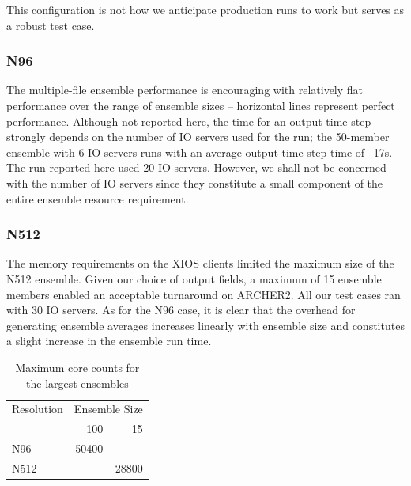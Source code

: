 \documentclass[twocolumn, 12pt]{paper}
\begin{document}
 This configuration is not how we anticipate production runs to work but serves as a robust test case.

\subsubsection{N96}

The multiple-file ensemble performance is encouraging with relatively flat performance over the range of ensemble sizes -- horizontal lines represent perfect performance.
Although not reported here, the time for an output time step strongly depends on the number of IO servers used for the run; the 50-member ensemble with 6 IO servers runs with an average output time step time of ~17s.
The run reported here used 20 IO servers.
However, we shall not be concerned with the number of IO servers since they constitute a small component of the entire ensemble resource requirement.



\subsubsection{N512}

The memory requirements on the XIOS clients limited the maximum size of the N512 ensemble.
Given our choice of output fields, a maximum of 15 ensemble members enabled an acceptable turnaround on ARCHER2.
All our test cases ran with 30 IO servers.
As for the N96 case, it is clear that the overhead for generating ensemble averages increases linearly with ensemble size and constitutes a slight increase in the ensemble run time.



\begin{table}[H]
	\begin{center}
	\begin{tabular}{|l|r|r|}
		\hline
		Resolution   & \multicolumn{2}{c|}{Ensemble Size} \\
		     & 100   & 15    															\\ \hline
		N96  & 50400 &       															\\
		N512 &       & 28800 															\\
		\hline
	\end{tabular}
	\caption{Maximum core counts for the largest ensembles}
  \label{table2}
	\end{center}
\end{table}
\end{document}
